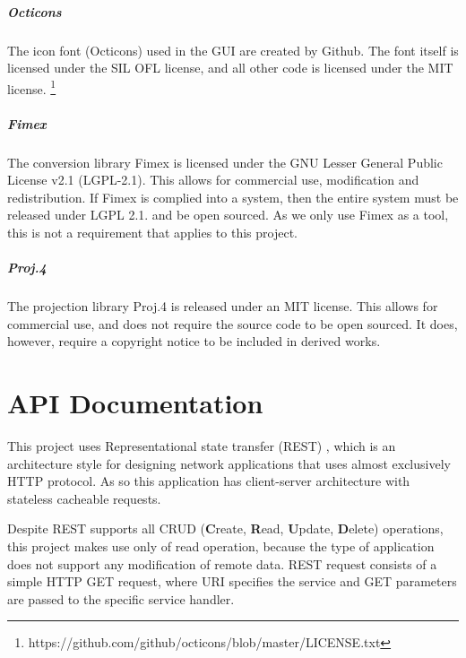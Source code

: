 \documentclass[11pt,a4paper,titlepage,oneside]{report}
\begin{document}
\paragraph{Octicons}
The icon font (Octicons) used in the \gls{GUI} are created by Github. The font itself is licensed under the SIL OFL license, and all other code is licensed under the MIT license. \footnote{https://github.com/github/octicons/blob/master/LICENSE.txt}

\paragraph{Fimex} The conversion library \gls{Fimex} is licensed under the GNU Lesser General Public License v2.1 (LGPL-2.1). This allows for commercial use, modification and redistribution. If \gls{Fimex} is complied into a system, then the entire system must be released under LGPL 2.1. and be open sourced. As we only use \gls{Fimex} as a tool, this is not a requirement that applies to this project.

\paragraph{Proj.4} The projection library Proj.4 is released under an MIT license. This allows for commercial use, and does not require the source code to be open sourced. It does, however, require a copyright notice to be included in derived works.


\begin{flushleft}
	
\end{flushleft}



\appendix
\printglossary[type=\acronymtype]
\printglossary
\chapter{API Documentation}
This project uses Representational state transfer (REST) \cite{REST:elkstein}, which is an architecture style for designing network applications that uses almost exclusively \gls{HTTP} \gls{protocol}. As so this application has client-server architecture with stateless cacheable requests.

Despite REST supports all CRUD (\textbf{C}reate, \textbf{R}ead, \textbf{U}pdate, \textbf{D}elete) operations, this project makes use only of read operation, because the type of application does not support any modification of remote data. REST request consists of a simple \gls{HTTP} GET request, where URI specifies the service and GET parameters are passed to the specific service handler. \\
\end{document}
